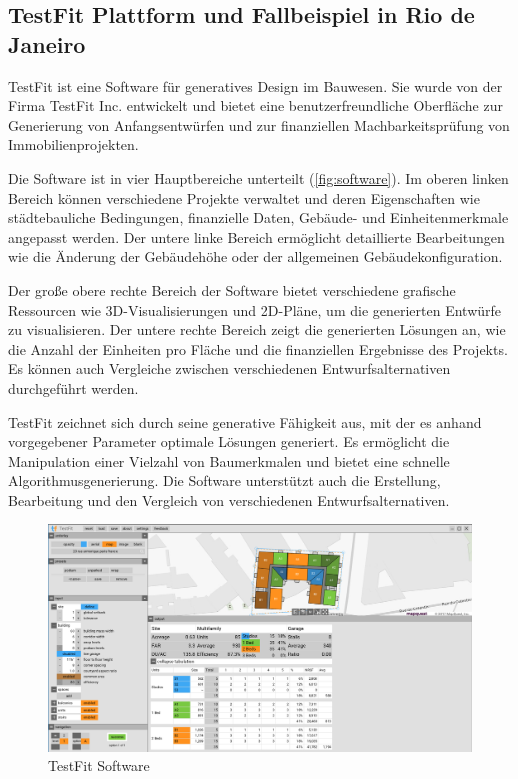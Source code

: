 \subsection*{TestFit Plattform und Fallbeispiel in  Rio de Janeiro}

TestFit ist eine Software für generatives Design im Bauwesen. Sie wurde von der Firma TestFit Inc. entwickelt und bietet eine benutzerfreundliche Oberfläche zur Generierung von Anfangsentwürfen und zur finanziellen Machbarkeitsprüfung von Immobilienprojekten.

Die Software ist in vier Hauptbereiche unterteilt (\autoref{fig:software}). Im oberen linken Bereich können verschiedene Projekte verwaltet und deren Eigenschaften wie städtebauliche Bedingungen, finanzielle Daten, Gebäude- und Einheitenmerkmale angepasst werden. Der untere linke Bereich ermöglicht detaillierte Bearbeitungen wie die Änderung der Gebäudehöhe oder der allgemeinen Gebäudekonfiguration.

Der große obere rechte Bereich der Software bietet verschiedene grafische Ressourcen wie 3D-Visualisierungen und 2D-Pläne, um die generierten Entwürfe zu visualisieren. Der untere rechte Bereich zeigt die generierten Lösungen an, wie die Anzahl der Einheiten pro Fläche und die finanziellen Ergebnisse des Projekts. Es können auch Vergleiche zwischen verschiedenen Entwurfsalternativen durchgeführt werden.

TestFit zeichnet sich durch seine generative Fähigkeit aus, mit der es anhand vorgegebener Parameter optimale Lösungen generiert. Es ermöglicht die Manipulation einer Vielzahl von Baumerkmalen und bietet eine schnelle Algorithmusgenerierung. Die Software unterstützt auch die Erstellung, Bearbeitung und den Vergleich von verschiedenen Entwurfsalternativen.

\begin{figure}[h]
  \begin{minipage}{0.5\textwidth}
    \centering
    \includegraphics[width=\textwidth]{./images/UnitsData.jpg}
  \end{minipage}
  \caption{TestFit Software}
  \label{fig:software}
\end{figure}

